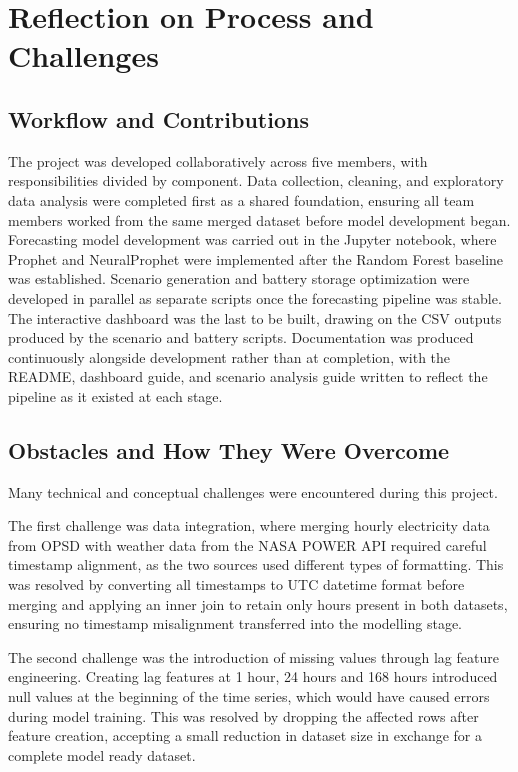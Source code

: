 \documentclass[conference]{IEEEtran}
\begin{document}
\section{Reflection on Process and Challenges}
 
\subsection{Workflow and Contributions}
 
The project was developed collaboratively across five members, with responsibilities divided by component. Data collection, cleaning, and exploratory data analysis were completed first as a shared foundation, ensuring all team members worked from the same merged dataset before model development began. Forecasting model development was carried out in the Jupyter notebook, where Prophet and NeuralProphet were implemented after the Random Forest baseline was established. Scenario generation and battery storage optimization were developed in parallel as separate scripts once the forecasting pipeline was stable. The interactive dashboard was the last to be built, drawing on the CSV outputs produced by the scenario and battery scripts. Documentation was produced continuously alongside development rather than at completion, with the README, dashboard guide, and scenario analysis guide written to reflect the pipeline as it existed at each stage.
 
\subsection{Obstacles and How They Were Overcome}
 
Many technical and conceptual challenges were encountered during this project.
 
The first challenge was data integration, where merging hourly electricity data from OPSD with weather data from the NASA POWER API required careful timestamp alignment, as the two sources used different types of formatting. This was resolved by converting all timestamps to UTC datetime format before merging and applying an inner join to retain only hours present in both datasets, ensuring no timestamp misalignment transferred into the modelling stage.
 
The second challenge was the introduction of missing values through lag feature engineering. Creating lag features at 1 hour, 24 hours and 168 hours introduced null values at the beginning of the time series, which would have caused errors during model training. This was resolved by dropping the affected rows after feature creation, accepting a small reduction in dataset size in exchange for a complete model ready dataset.
 
\end{document}

